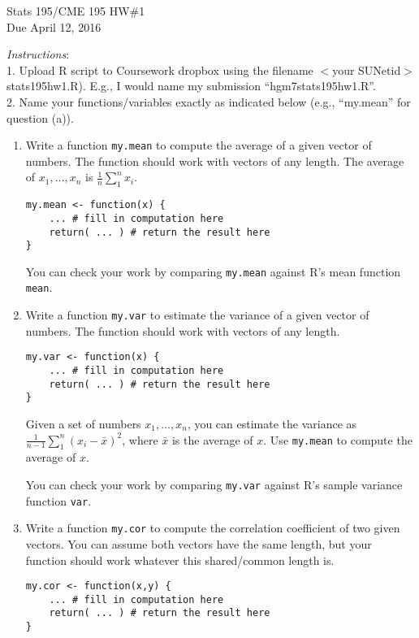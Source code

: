 \documentclass[11pt]{article}
\theoremstyle{plain}
\theoremstyle{definition}
\begin{document}
\noindent Stats 195/CME 195 HW\#1\\
Due April 12, 2016

\bigskip
\noindent \emph{Instructions}:\\1. Upload R script to Coursework
dropbox using the filename $<$your SUNetid$>$stats195hw1.R). E.g., I
would name my submission ``hgm7stats195hw1.R''.\\
2. Name your functions/variables exactly as indicated below (e.g., ``my.mean'' for question (a)).

\bigskip
\begin{enumerate}
\item Write a function \texttt{my.mean} to compute the average of a
given vector of numbers. The function should work with vectors of any
length. The average of $x_1,\ldots,x_n$ is $\frac{1}{n}\sum_1^n{x_i}$.

\begin{verbatim}
my.mean <- function(x) {
	... # fill in computation here
	return( ... ) # return the result here
}
\end{verbatim}

You can check your work by comparing \texttt{my.mean} against R's mean function \texttt{mean}.

\item  Write a function \texttt{my.var} to estimate the variance of a given vector of numbers. The function should work with vectors of any length.

\begin{verbatim}
my.var <- function(x) {
	... # fill in computation here
	return( ... ) # return the result here
}
\end{verbatim}

 Given a set of numbers $x_1,...,x_n$, you can estimate the variance as $\frac{1}{n-1}\sum_1^n{(x_i-\bar{x})^2}$, where $\bar{x}$ is the average of $x$. Use \texttt{my.mean} to compute the average of $x$.

You can check your work by comparing \texttt{my.var} against R's sample variance function \texttt{var}.

\item Write a function \texttt{my.cor} to compute the correlation coefficient of two given vectors. You can assume both vectors have the same length, but your function should work whatever this shared/common length is.

\begin{verbatim}
my.cor <- function(x,y) {
	... # fill in computation here
	return( ... ) # return the result here
}
\end{verbatim}



\end{enumerate}
\end{document}

